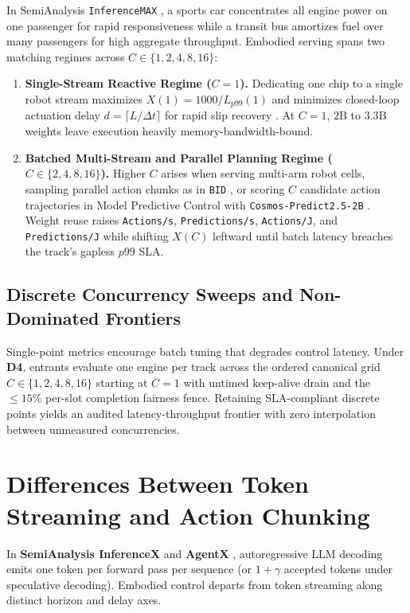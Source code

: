 \documentclass[10pt,letterpaper]{article}
\begin{document}
In SemiAnalysis \texttt{InferenceMAX} \cite{Patel2025inferencemax}, a sports car concentrates all engine power on one passenger for rapid responsiveness while a transit bus amortizes fuel over many passengers for high aggregate throughput. Embodied serving spans two matching regimes across $C \in \{1, 2, 4, 8, 16\}$:
\begin{enumerate}
    \item \textbf{Single-Stream Reactive Regime ($C = 1$).} Dedicating one chip to a single robot stream maximizes $X(1) = 1000 / L_{p99}(1)$ and minimizes closed-loop actuation delay $d = \lceil L / \Delta t \rceil$ for rapid slip recovery \cite{Black2025realtime,Tang2025vlash}. At $C = 1$, $2\text{B}$ to $3.3\text{B}$ weights leave execution heavily memory-bandwidth-bound.
    \item \textbf{Batched Multi-Stream and Parallel Planning Regime ($C \in \{2, 4, 8, 16\}$).} Higher $C$ arises when serving multi-arm robot cells, sampling parallel action chunks as in \texttt{BID} \cite{Black2025realtime}, or scoring $C$ candidate action trajectories in Model Predictive Control with \texttt{Cosmos-Predict2.5-2B} \cite{NVIDIA2025cosmos}. Weight reuse raises \texttt{Actions/s}, \texttt{Predictions/s}, \texttt{Actions/J}, and \texttt{Predictions/J} while shifting $X(C)$ leftward until batch latency breaches the track's gapless $p99$ SLA.
\end{enumerate}

\subsection{Discrete Concurrency Sweeps and Non-Dominated Frontiers}

Single-point metrics encourage batch tuning that degrades control latency. Under \textbf{D4}, entrants evaluate one engine per track across the ordered canonical grid $C \in \{1, 2, 4, 8, 16\}$ starting at $C = 1$ with untimed keep-alive drain and the $\le 15\%$ per-slot completion fairness fence. Retaining SLA-compliant discrete points yields an audited latency-throughput frontier with zero interpolation between unmeasured concurrencies.

\section{Differences Between Token Streaming and Action Chunking}

In \textbf{SemiAnalysis InferenceX} \cite{Patel2025inferencemax,Patel2026inferencexv2} and \textbf{AgentX} \cite{Patel2026agentx}, autoregressive LLM decoding emits one token per forward pass per sequence (or $1 + \gamma$ accepted tokens under speculative decoding). Embodied control departs from token streaming along distinct horizon and delay axes.
\end{document}
